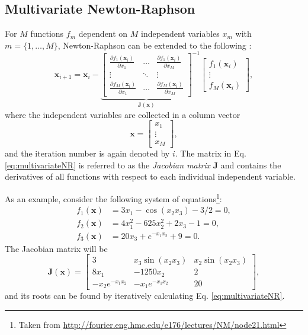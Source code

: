 \subsection{Multivariate Newton-Raphson}\label{sec:multivariateNR}
For $M$ functions $f_m$ dependent on $M$ independent variables $x_m$ with $m = \{1, \hdots, M\}$,  Newton-Raphson can be extended to the following \SWcomment[citation?]:
\begin{equation}\label{eq:multivariateNR}
    \mathbf{x}_{i+1} = 
    \mathbf{x}_i - 
    {\underbrace{\begin{bmatrix}
        \frac{\partial f_1(\mathbf{x}_i)}{\partial x_1} & \hdots & \frac{\partial f_1(\mathbf{x}_i)}{\partial x_M}\\
        \vdots & \ddots & \vdots\\
        \frac{\partial f_M(\mathbf{x}_i)}{\partial x_1} & \hdots & \frac{\partial f_M(\mathbf{x}_i)}{\partial x_M}
    \end{bmatrix}}_{\mathbf{J}(\mathbf{x})}}^{-1}
    \begin{bmatrix}
        f_1(\mathbf{x}_i)\\
        \vdots\\
        f_M(\mathbf{x}_i)
    \end{bmatrix},
\end{equation}
where the independent variables are collected in a column vector
\begin{equation}
    \mathbf{x} = \begin{bmatrix}
        x_1\\
        \vdots\\
        x_M
    \end{bmatrix},
\end{equation}
and the iteration number is again denoted by $i$.
The matrix in Eq. \eqref{eq:multivariateNR} is referred to as the \textit{Jacobian matrix} $\mathbf{J}$ and contains the derivatives of all functions with respect to each individual independent variable. 

As an example, consider the following system of equations\footnote{Taken from \url{http://fourier.eng.hmc.edu/e176/lectures/NM/node21.html}}:
\begin{subequations}
    \begin{align}
        f_1(\mathbf{x}) &= 3 x_1 - \cos(x_2x_3) - 3/2 = 0,\\
        f_2(\mathbf{x}) &= 4x_1^2 - 625 x_2^2 + 2x_3-1 = 0,\\
        f_3(\mathbf{x}) &= 20 x_3 + e^{-x_1x_2}+9 = 0.
    \end{align} 
\end{subequations}
The Jacobian matrix will be 
\begin{equation*}
    \mathbf{J}(\mathbf{x}) = \begin{bmatrix}
        3 & x_3 \sin (x_2x_3) & x_2 \sin(x_2x_3)\\
        8x_1 & -1250 x_2 & 2\\
        -x_2e^{-x_1x_2} & -x_1e^{-x_1x_2} & 20
    \end{bmatrix},
\end{equation*}
and its roots can be found by iteratively calculating Eq. \eqref{eq:multivariateNR}.

